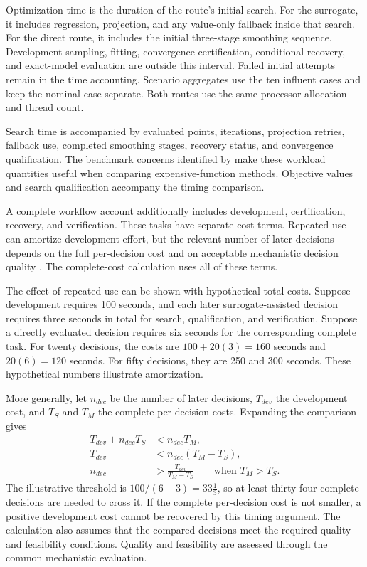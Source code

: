 Optimization time is the duration of the route's initial search. For the surrogate, it includes regression, projection, and any value-only fallback inside that search. For the direct route, it includes the initial three-stage smoothing sequence. Development sampling, fitting, convergence certification, conditional recovery, and exact-model evaluation are outside this interval. Failed initial attempts remain in the time accounting. Scenario aggregates use the ten influent cases and keep the nominal case separate. Both routes use the same processor allocation and thread count.

Search time is accompanied by evaluated points, iterations, projection retries, fallback use, completed smoothing stages, recovery status, and convergence qualification. The benchmark concerns identified by \citet{Bliek2023} make these workload quantities useful when comparing expensive-function methods. Objective values and search qualification accompany the timing comparison.

A complete workflow account additionally includes development, certification, recovery, and verification. These tasks have separate cost terms. Repeated use can amortize development effort, but the relevant number of later decisions depends on the full per-decision cost and on acceptable mechanistic decision quality \citep{BhosekarIerapetritou2018,Bliek2023}. The complete-cost calculation uses all of these terms.

The effect of repeated use can be shown with hypothetical total costs. Suppose development requires 100 seconds, and each later surrogate-assisted decision requires three seconds in total for search, qualification, and verification. Suppose a directly evaluated decision requires six seconds for the corresponding complete task. For twenty decisions, the costs are $100+20(3)=160$ seconds and $20(6)=120$ seconds. For fifty decisions, they are 250 and 300 seconds. These hypothetical numbers illustrate amortization.

More generally, let $n_{dec}$ be the number of later decisions, $T_{dev}$ the development cost, and $T_S$ and $T_M$ the complete per-decision costs. Expanding the comparison gives
\[
\begin{aligned}
T_{dev}+n_{dec}T_S&<n_{dec}T_M,\\
T_{dev}&<n_{dec}(T_M-T_S),\\
n_{dec}&>\frac{T_{dev}}{T_M-T_S}\qquad\text{when }T_M>T_S.
\end{aligned}
\]
The illustrative threshold is $100/(6-3)=33\tfrac13$, so at least thirty-four complete decisions are needed to cross it. If the complete per-decision cost is not smaller, a positive development cost cannot be recovered by this timing argument. The calculation also assumes that the compared decisions meet the required quality and feasibility conditions. Quality and feasibility are assessed through the common mechanistic evaluation.

